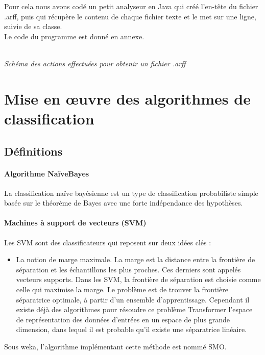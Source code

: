 \documentclass[a4paper,11pt]{article}
\begin{document}
Pour cela nous avons codé un petit analyseur en Java qui créé l’en-tête du fichier .arff, puis qui récupère le contenu de chaque fichier texte et le met sur une ligne, suivie de sa classe.\\Le code du programme est donné en annexe.\\\\
\vspace{2cm}

\noindent
{}
\begin{center}
\textit{Schéma des actions effectuées pour obtenir un fichier .arff}
\end{center}

\newpage
\section{Mise en œuvre des algorithmes de classification}
\subsection{Définitions}
\paragraph{Algorithme NaïveBayes}
La classification naïve bayésienne est un type de classification probabiliste simple basée sur le théorème de Bayes avec une forte indépendance des hypothèses.

\paragraph{Machines à support de vecteurs (SVM)}
Les SVM sont des classificateurs qui reposent sur deux idées clés :
\begin{itemize}
\item La notion de marge maximale. La marge est la distance entre la frontière de séparation et les échantillons les plus proches. Ces derniers sont appelés vecteurs supports. Dans les SVM, la frontière de séparation est choisie comme celle qui maximise la marge. Le problème est de trouver la frontière séparatrice optimale, à partir d’un ensemble d’apprentissage. Cependant il existe déjà des algorithmes pour résoudre ce problème
Transformer l’espace de représentation des données d’entrées en un espace de plus grande dimension, dans lequel il est probable qu’il existe une séparatrice linéaire.
\end{itemize}
Sous weka, l’algorithme implémentant cette méthode est nommé SMO.
\end{document}

